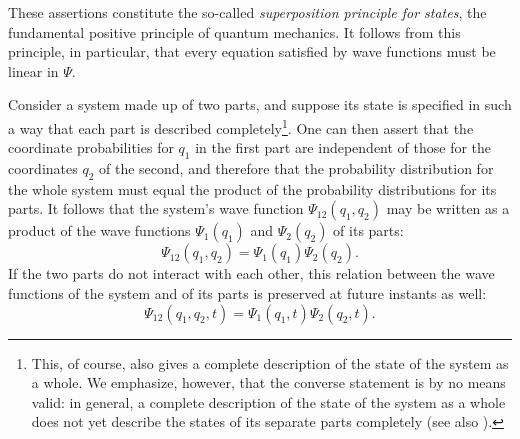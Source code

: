 These assertions constitute the so-called \textit{superposition principle for
states}, the fundamental positive principle of quantum mechanics. It follows
from this principle, in particular, that every equation satisfied by wave
functions must be linear in $\Psi$.

Consider a system made up of two parts, and suppose its state is specified in
such a way that each part is described completely\footnote{This, of course,
also gives a complete description of the state of the system as a whole. We
emphasize, however, that the converse statement is by no means valid: in
general, a complete description of the state of the system as a whole does not
yet describe the states of its separate parts completely (see also ).}.
One can then assert that the coordinate probabilities for $q_1$ in the
first part are independent of those for the coordinates $q_2$
of the second, and therefore that the probability distribution for the whole
system must equal the product of the probability distributions for its parts.
It follows that the system's wave function $\Psi_{12}(q_1,q_2)$ may be written
as a product of the wave functions $\Psi_1(q_1)$ and
$\Psi_2(q_2)$ of its%
parts:
\begin{equation}
  \Psi_{12}(q_1,q_2)=\Psi_1(q_1)\Psi_2(q_2).
  \tag{2.3}
\end{equation}
If the two parts do not interact with each other, this relation between the
wave functions of the system and of its parts is preserved at future instants
as well:
\begin{equation}
  \Psi_{12}(q_1,q_2,t)=\Psi_1(q_1,t)\Psi_2(q_2,t).
  \tag{2.4}
\end{equation}
